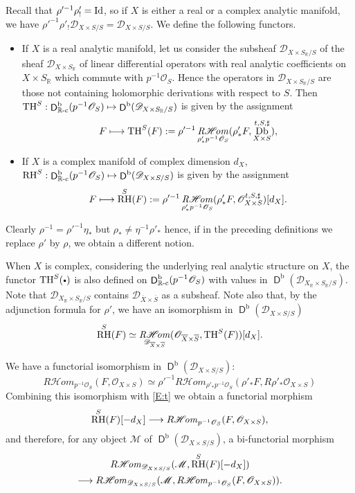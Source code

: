 \documentclass[english]{smfart}
\numberwithin{subsection}{section}
\def\shd{\mathcal{D}}\let\cD\shd
\def\shm{\mathcal{M}}
\def\sho{\mathcal{O}}\let\cO\sho
\newcommand{\R}{\mathbb{R}}\let\RR\R
\newcommand{\Rhom}{R\shhom}
\newcommand{\shhom}{\mathcal{H}\!\mathit{om}}\let\ho\shhom
\DeclareMathOperator{\rh}{\mathit{R}\shhom}
\DeclareMathOperator{\RH}{RH}
\newcommand{\rb}{\mathrm{b}}
\newcommand{\rc}{{\R\textup{-c}}}
\newcommand{\XS}{X\times S}
\newcommand{\DXS}{\shd_{\XS/S}}
\newcommand{\DXSR}{\shd_{\XS_\RR/S}}
\DeclareMathOperator{\rD}{\mathsf{D}}
\DeclareMathOperator{\Db}{\mathfrak{Db}}
\newcommand{\cbbullet}{{\raisebox{1pt}{$\sbullet$}}}
\newcommand{\sbullet}{{\scriptscriptstyle\bullet}}
\newcommand{\pOS}{p^{-1}\sho_S}
\numberwithin{equation}{section}
\theoremstyle{plain}
\theoremstyle{definition}
\def\to{\mathchoice{\longrightarrow}{\rightarrow}{\rightarrow}{\rightarrow}}
\def\mto{\mathchoice{\longmapsto}{\mapsto}{\mapsto}{\mapsto}}
\begin{document}
Recall that $\rho'^{-1}\rho'_!=\operatorname{Id}$, so if $X$ is either a real or a complex analytic manifold, we have $\rho'^{-1}\rho'_!\DXS=\DXS$. We define the following functors.
\begin{itemize}
\item
If $X$ is a real analytic manifold, let us consider the subsheaf $\DXSR$ of the sheaf $\shd_{\XS_{\R}}$ of linear differential operators with real analytic coefficients on \hbox{$\XS_\RR$} which commute with $\pOS$. Hence the operators in $\DXSR$ are those not containing holomorphic derivations with respect to $S$. Then $\TH^S:\rD^\rb_\rc(\pOS)\mto\rD^\rb(\DXSR)$ is given by the assignment
$$F\mto \TH^S(F):=
\rho'^{-1}\rh_{\rho'_*\pOS}(\rho'_*F, \Db^{t,S,\sharp}_{\XS}),$$
\item
If $X$ is a complex manifold of complex dimension $d_X$, $\RH^S:\rD^\rb_\rc(\pOS)\mto\rD^\rb(\DXS)$ is given by the assignment
$$F\mto \RH^S(F):=
\rho'^{-1}\rh_{\rho'_*\pOS}(\rho'_*F, \sho^{t,S,\sharp}_{\XS})[d_X].$$
\end{itemize}

Clearly $\rho^{-1}=\rho'^{-1}\eta_*$ but $\rho_*\neq \eta^{-1}\rho'_*$ hence, if in the preceding definitions we replace $\rho'$ by $\rho$, we obtain a different notion.

When $X$ is complex, considering the underlying real analytic structure on $X$, the functor $\TH^S(\cbbullet)$ is also defined on $\rD^\rb_{\rc}(\pOS)$ with values in $\rD^\rb(\shd_{X_\RR\times S_\RR/S})$. Note that $\shd_{X_\RR\times S_\RR/S}$ contains $\shd_{\overline{X}\times \overline{S}}$ as a subsheaf. Note also that, by the adjunction formula for $\rho'$, we have an isomorphism in $\rD^\rb(\DXS)$\
\begin{equation}\label{E:3n}
\RH^S(F)\simeq \rh_{\shd_{\overline{X}\times \overline{S}}}(\sho_{\overline{X}\times \overline{S}}, \TH^S(F))[d_X].
\end{equation}

We have a functorial isomorphism in $\rD^\rb(\DXS)$:
$$\Rhom_{\pOS}(F,\sho_{\XS})\simeq\rho'^{-1}\Rhom_{\rho'_*{\pOS}}(\rho'_*F, R\rho'_*\sho_{\XS})$$
Combining this isomorphism with \eqref{E:t} we obtain a functorial morphism
\begin{equation}
\RH^S(F)[-d_X]\to\Rhom_{\pOS}(F,\sho_{\XS}),
\end{equation}
and therefore, for any object $\shm$ of $\rD^\rb(\DXS)$, a bi-functorial morphism
\begin{multline}\label{E:Theta2}
\Rhom_{\DXS}(\shm, \RH^S(F)[-d_X])\\
\to \Rhom_{\DXS}(\shm, \Rhom_{\pOS}(F,\sho_{\XS})).
\end{multline}
\end{document}
